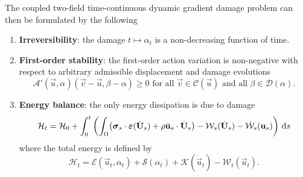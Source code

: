 The coupled two-field time-continuous dynamic gradient damage problem can then be formulated by the following
\begin{model} \label{model:dynagraddama}
\begin{enumerate}
\item \textbf{Irreversibility}: the damage $t\mapsto\alpha_t$ is a non-decreasing function of time.
\item \textbf{First-order stability}: the first-order action variation is non-negative with respect to arbitrary admissible displacement and damage evolutions
\begin{equation} \label{eq:vi}
\mathcal{A}'(\vec{u},\alpha)(\vec{v}-\vec{u},\beta-\alpha)\geq 0\text{ for all $\vec{v}\in\mathcal{C}(\vec{u})$ and all $\beta\in\mathcal{D}(\alpha)$}.
\end{equation}
\item \textbf{Energy balance}: the only energy dissipation is due to damage
\begin{equation} \label{eq:dyngdeb}
\mathcal{H}_t=\mathcal{H}_0+\int_0^t\left(\int_\Omega\bigl(\sig_s\cdot\eps(\dot{\vec{U}}_s)+\rho\ddot{\vec{u}}_s\cdot\dot{\vec{U}}_s\bigr)-\mathcal{W}_s(\dot{\vec{U}}_s)-\dot{\mathcal{W}}_s(\vec{u}_s)\right)\D{s}
\end{equation}
where the total energy is defined by
\begin{equation}
\mathcal{H}_t=\mathcal{E}(\vec{u}_t,\alpha_t)+\mathcal{S}(\alpha_t)+\mathcal{K}(\dot{\vec{u}}_t)-\mathcal{W}_t(\vec{u}_t).
\end{equation}
\end{enumerate}
\end{model}

